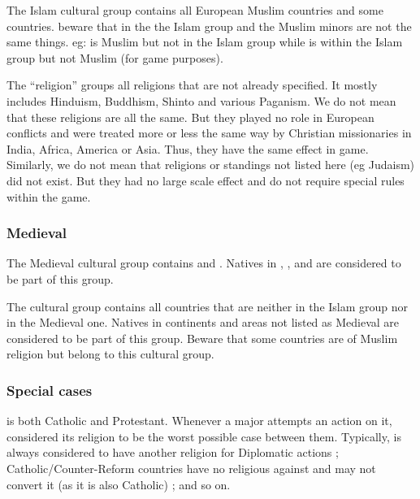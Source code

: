 \aparag The Islam cultural group contains all European Muslim countries and
some \ROTW countries.
\bparag beware that in the \ROTW the Islam group and the Muslim minors are not
the same things. eg: \paysGujerat is Muslim but not in the Islam group while
\paysMogol is within the Islam group but not Muslim (for game purposes).

\aparag The  ``religion'' groups all religions that are not
already specified.
\bparag It mostly includes Hinduism, Buddhism, Shinto and various Paganism.
\bparag We do not mean that these religions are all the same. But they played
no role in European conflicts and were treated more or less the same way by
Christian missionaries in India, Africa, America or Asia. Thus, they have the
same effect in game.
\bparag Similarly, we do not mean that religions or standings not listed here
(eg Judaism) did not exist. But they had no large scale effect and do not
require special rules within the game.


\subsubsection{Medieval}
\aparag The Medieval cultural group contains \paysInca and \paysAzteque.
\bparag Natives in %
\continentAfrica, \continentSiberia, \granderegionOceania and
\granderegionPacifique are considered to be part of this group.

\subsubsectionJ{\ROTW}{\techrotw}
\aparag The \ROTW cultural group contains all \ROTW countries that are neither
in the Islam group nor in the Medieval one.
\bparag Natives in continents and areas not listed as Medieval are considered
to be part of this group.
\bparag Beware that some \ROTW countries are of Muslim religion but belong to
this cultural group.


\subsubsection{Special cases}
\aparag \paysSuisse is both Catholic and Protestant.
\bparag Whenever a major attempts an action on it, considered its religion to
be the worst possible case between them.
\bparag Typically, \paysSuisse is always considered to have another religion
for Diplomatic actions ; Catholic/Counter-Reform countries have no religious
\CB against \paysSuisse and may not convert it (as it is also Catholic) ; and
so on.

